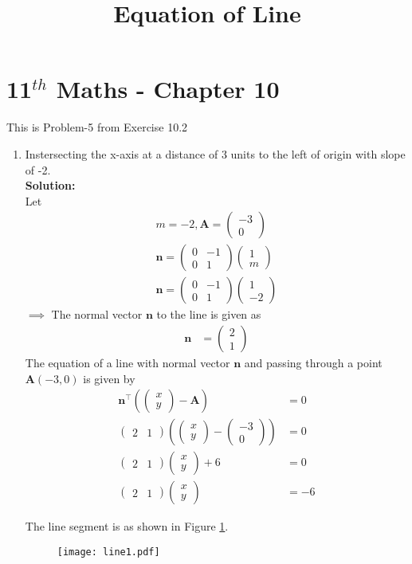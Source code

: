 \documentclass[journal,10pt,twocolumn]{article}
\providecommand{\brak}[1]{\ensuremath{\left(#1\right)}}
\newcommand{\solution}{\noindent \textbf{Solution: }}
\newcommand{\myvec}[1]{\ensuremath{\begin{pmatrix}#1\end{pmatrix}}}
\let\vec\mathbf
\begin{document}
\begin{center}
\title{\textbf{Equation  of Line}}
\date{\vspace{-5ex}} %
\maketitle
\end{center}
\setcounter{page}{1}

\section{11$^{th}$ Maths - Chapter 10}
This is Problem-5 from Exercise 10.2
\begin{enumerate}
\item Instersecting the x-axis at a distance of 3 units to the left of origin with slope of -2.
\\
\solution 
\\
Let
\begin{align}
m=-2,\vec{A}=\myvec{-3\\0}\\
\vec{n}=\myvec{0&-1\\0&1}\myvec{1\\m}\\ 
\vec{n}=\myvec{0&-1\\0&1}\myvec{1\\-2}
\end{align}
$\implies$ The normal vector $\vec{n}$ to the line is given as
\begin{align}
\vec{n} &=  \myvec{2 \\1} 
\end{align}
The equation of a line with normal vector $\vec{n}$ and passing through a point $\vec{A}(-3,0)$ is given by
\begin{align}
	\vec{n}^\top\brak{\myvec{x\\y}-\vec{A}} &= 0 \\
	\myvec { 2 & 1 } \brak{ \myvec{ x\\y } - \myvec{ -3 \\ 0}} &= 0  \\
	\myvec{ 2 & 1} \myvec{x\\y} +6 &= 0 \\
        \label{eq:1}
	\myvec{ 2 & 1} \myvec{x\\y}  &= -6
\end{align}

 The line segment is as shown in Figure \ref{fig:Fig1}.
\begin{figure}[!h]
	\begin{center}
		\texttt{[image: line1.pdf]}
	\end{center}
\caption{}
\label{fig:Fig1}
\end{figure}

\end{enumerate}
\end{document}
